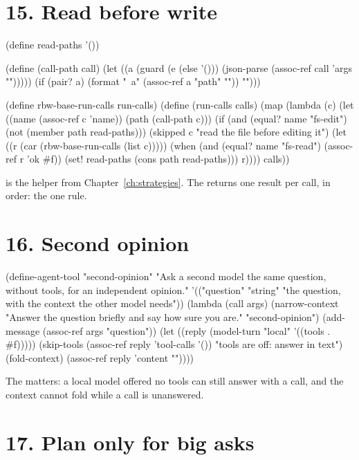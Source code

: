 \section*{15. Read before write}

\begin{scm}
(define read-paths '())

(define (call-path call)
  (let ((a (guard (e (else '())) (json-parse (assoc-ref call 'args "{}")))))
    (if (pair? a) (format "~a" (assoc-ref a "path" "")) "")))

(define rbw-base-run-calls run-calls)
(define (run-calls calls)
  (map (lambda (c)
         (let ((name (assoc-ref c 'name)) (path (call-path c)))
           (if (and (equal? name "fs-edit") (not (member path read-paths)))
               (skipped c "read the file before editing it")
               (let ((r (car (rbw-base-run-calls (list c)))))
                 (when (and (equal? name "fs-read") (assoc-ref r 'ok #f))
                   (set! read-paths (cons path read-paths)))
                 r))))
       calls))
\end{scm}

 is the helper from Chapter~\ref{ch:strategies}. The
 returns one result per call, in order: the one rule.

\section*{16. Second opinion}

\begin{scm}
(define-agent-tool "second-opinion"
  "Ask a second model the same question, without tools, for an independent opinion."
  '(("question" "string" "the question, with the context the other model needs"))
  (lambda (call args)
    (narrow-context "Answer the question briefly and say how sure you are." "second-opinion")
    (add-message (assoc-ref args "question"))
    (let ((reply (model-turn "local" '((tools . #f)))))
      (skip-tools (assoc-ref reply 'tool-calls '()) "tools are off: answer in text")
      (fold-context)
      (assoc-ref reply 'content ""))))
\end{scm}

The  matters: a local model offered no tools can still
answer with a call, and the context cannot fold while a call is
unanswered.

\section*{17. Plan only for big asks}

